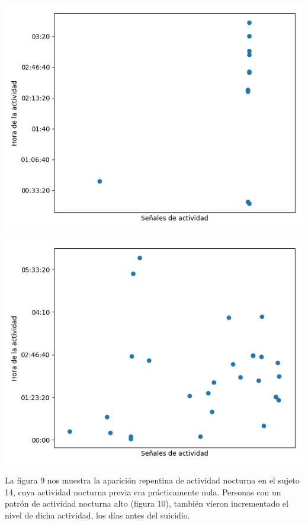 \documentclass[12pt, donotrepeattitle, jou]{apa6}
\begin{document}
    \begin{center}
        \begin{minipage}{0.39\linewidth}
            \includegraphics[width=\linewidth]{images/time_angie}
        \end{minipage}
        \begin{minipage}{0.39\linewidth}
            \includegraphics[width=\linewidth]{images/time_juan}
        \end{minipage}
    \end{center}
    
    La figura 9 nos muestra la aparición repentina de actividad nocturna en el sujeto 14, cuya actividad nocturna previa era prácticamente nula. Personas con un patrón de actividad nocturna alto (figura 10), también vieron incrementado el nivel de dicha actividad, los días antes del suicidio.
\end{document}
